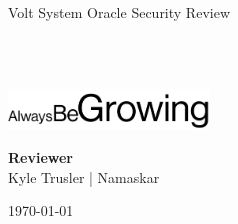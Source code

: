 \begin{titlepage}
  \vbox{}
  \vbox{}

  \begin{center}


    \noindent\makebox[\linewidth]{\rule{.7\paperwidth}{.6pt}}\\[0.7cm]

    { \huge \bfseries

      Volt System Oracle Security Review
    }\\[0.25cm]
    
    \noindent\makebox[\linewidth]{\rule{.7\paperwidth}{.6pt}}\\[0.7cm]

    
    \vfill

    \includegraphics[width=0.40\textwidth]{img/abg_wordmark.png}

    
    \large
    {\bfseries Reviewer}\\
    
    Kyle Trusler | Namaskar

    {\large \today}

  \end{center}

\end{titlepage}
